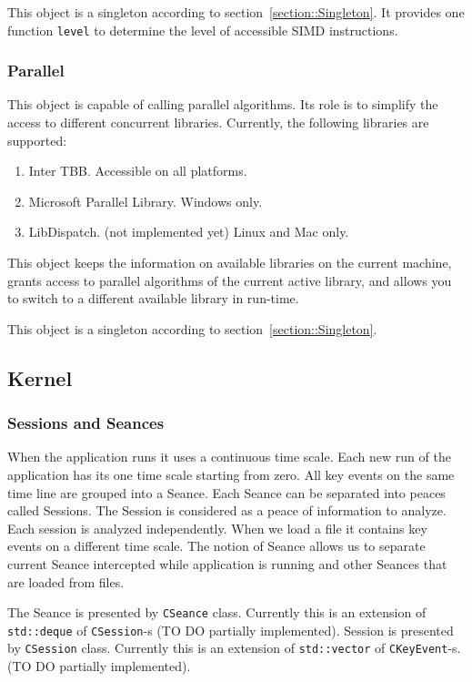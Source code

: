 \documentclass{article}
\begin{document}
This object is a singleton according to section~\ref{section::Singleton}. It provides one function \verb"level" to determine the level of accessible SIMD instructions.

\subsubsection{Parallel}

This object is capable of calling parallel algorithms. Its role is to simplify the access to different concurrent libraries. Currently, the following libraries are supported:
\begin{enumerate}
\item Inter TBB. Accessible on all platforms.
\item Microsoft Parallel Library. Windows only.
\item LibDispatch. (not implemented yet) Linux and Mac only.
\end{enumerate}
This object keeps the information on available libraries on the current machine, grants access to parallel algorithms of the current active library, and allows you to switch to a different available library in run-time.

This object is a singleton according to section~\ref{section::Singleton}.

\subsection{Kernel}


\subsubsection{Sessions and Seances}

When the application runs it uses a continuous time scale. Each new run of the application has its one time scale starting from zero. All key events on the same time line are grouped into a Seance. Each Seance can be separated into peaces called Sessions. The Session is considered as a peace of information to analyze. Each session is analyzed independently. When we load a file it contains key events on a different time scale. The notion of Seance allows us to separate current Seance intercepted while application is running and other Seances that are loaded from files.

The Seance is presented by \verb"CSeance" class. Currently this is an extension of \verb"std::deque" of \verb"CSession"-s (TO DO partially implemented). Session is presented by \verb"CSession" class. Currently this is an extension of \verb"std::vector" of \verb"CKeyEvent"-s. (TO DO partially implemented).
\end{document}
